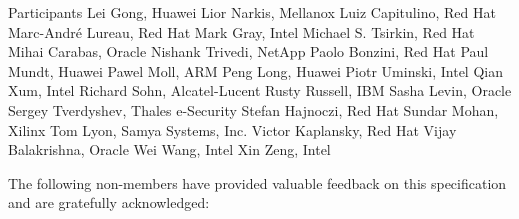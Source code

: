 \begin{oasistitlesection}{Participants}
Lei Gong,	Huawei	\newline
Lior Narkis,	Mellanox	\newline
Luiz Capitulino,	Red Hat	\newline
Marc-André Lureau, Red Hat	\newline
Mark Gray, Intel	\newline
Michael S. Tsirkin,	Red Hat	\newline
Mihai Carabas,	Oracle	\newline
Nishank Trivedi, NetApp	\newline
Paolo Bonzini,	Red Hat	\newline
Paul Mundt, Huawei	\newline
Pawel Moll,	ARM	\newline
Peng Long,	Huawei	\newline
Piotr Uminski, Intel	\newline
Qian Xum, Intel	\newline
Richard Sohn,	Alcatel-Lucent	\newline
Rusty Russell,	IBM	\newline
Sasha Levin,	Oracle	\newline
Sergey Tverdyshev,	Thales e-Security	\newline
Stefan Hajnoczi,	Red Hat	\newline
Sundar Mohan, Xilinx	\newline
Tom Lyon,	Samya Systems, Inc.	\newline
Victor Kaplansky, Red Hat	\newline
Vijay Balakrishna,	Oracle	\newline
Wei Wang, Intel	\newline
Xin Zeng, Intel	\newline
\end{oasistitlesection}

The following non-members have provided valuable feedback on this
specification and are gratefully acknowledged:

